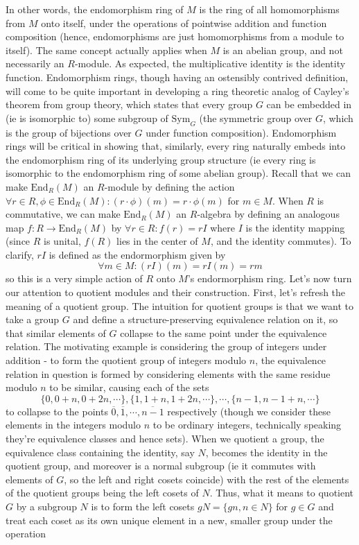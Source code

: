 \documentclass{article}
\begin{document}
In other words, the endomorphism ring of $ M $ is the ring of all homomorphisms from $ M $ onto itself, under the operations of pointwise addition and function composition (hence, endomorphisms are just homomorphisms from a module to itself). The same concept actually applies when $ M $ is an abelian group, and not necessarily an $ R $-module. As expected, the multiplicative identity is the identity function. Endomorphism rings, though having an ostensibly contrived definition, will come to be quite important in developing a ring theoretic analog of Cayley's theorem from group theory, which states that every group $ G $ can be embedded in (ie is isomorphic to) some subgroup of $ \text{Sym}_G $ (the symmetric group over $ G $, which is the group of bijections over $ G $ under function composition). Endomorphism rings will be critical in showing that, similarly, every ring naturally embeds into the endomorphism ring of its underlying group structure (ie every ring is isomorphic to the endomorphism ring of some abelian group).
\n
Recall that we can make $ \text{End}_R(M) $ an $ R $-module by defining the action $ \forall r \in R, \phi \in \text{End}_R(M): (r \cdot \phi)(m) = r \cdot \phi(m) $ for $ m \in M $. When $ R $ is commutative, we can make $ \text{End}_R(M) $ an $ R $-algebra by defining an analogous map $ f: R \rightarrow \text{End}_R(M) $ by $ \forall r \in R: f(r) = r I $ where $ I $ is the identity mapping (since $ R $ is unital, $ f(R) $ lies in the center of $ M $, and the identity commutes). To clarify, $ r I $ is defined as the endormorphism given by
$$ \forall m \in M: (r I)(m) = r I(m) = r m $$
so this is a very simple action of $ R $ onto $ M $'s endormorphism ring.
\nn
Let's now turn our attention to quotient modules and their construction. First, let's refresh the meaning of a quotient group. The intuition for quotient groups is that we want to take a group $ G $ and define a structure-preserving equivalence relation on it, so that similar elements of $ G $ collapse to the same point under the equivalence relation. The motivating example is considering the group of integers under addition - to form the quotient group of integers modulo $ n $, the equivalence relation in question is formed by considering elements with the same residue modulo $ n $ to be similar, causing each of the sets
$$ \{ 0, 0 + n, 0 + 2 n, \cdots \}, \{ 1, 1 + n, 1 + 2 n, \cdots \}, \cdots, \{ n - 1, n - 1 + n, \cdots \} $$
to collapse to the points $ \overline{0}, \overline{1}, \cdots, \overline{n - 1} $ respectively (though we consider these elements in the integers modulo $ n $ to be ordinary integers, technically speaking they're equivalence classes and hence sets). When we quotient a group, the equivalence class containing the identity, say $ N $, becomes the identity in the quotient group, and moreover is a normal subgroup (ie it commutes with elements of $ G $, so the left and right cosets coincide) with the rest of the elements of the quotient groups being the left cosets of $ N $. Thus, what it means to quotient $ G $ by a subgroup $ N $ is to form the left cosets $ g N = \{ g n, n \in N \} $ for $ g \in G $ and treat each coset as its own unique element in a new, smaller group under the operation
\end{document}

